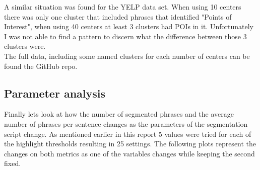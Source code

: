 \documentclass[11pt]{article}
\begin{document}
A similar situation was found for the YELP data set. When using 10 centers there was only one cluster that included phrases that identified "Points of Interest", when using 40 centers at least 3 clusters had POIs in it. Unfortunately I was not able to find a pattern to discern what the difference between those 3 clusters were.\\

The full data, including some named clusters for each number of centers can be found the GitHub repo.

\subsection*{Parameter analysis}
Finally lets look at how the number of segmented phrases and the average number of phrases per sentence changes as the parameters of the segmentation script change. As mentioned earlier in this report 5 values were tried for each of the highlight thresholds resulting in 25 settings. The following plots represent the changes on both metrics as one of the variables changes while keeping the second fixed.
\end{document}

